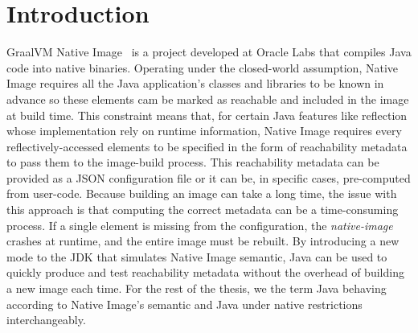 \chapter{Introduction}




GraalVM Native Image~\cite{noauthor_native_nodate} is a project developed at Oracle Labs that compiles Java code into native binaries. Operating under the closed-world assumption, Native Image requires all the Java application's classes and libraries to be known in advance so these elements cam be marked as reachable and included in the image at build time.
This constraint means that, for certain Java features like reflection whose implementation rely on runtime information, Native Image requires every reflectively-accessed elements to be specified in the form of reachability metadata to pass them to the image-build process. This reachability metadata can be provided as a JSON configuration file or it can be, in specific cases, pre-computed from user-code.
Because building an image can take a long time, the issue with this approach is that computing the correct metadata can be a time-consuming process. If a single element is missing from the configuration, the \textit{native-image} crashes at runtime, and the entire image must be rebuilt.
By introducing a new mode to the JDK that simulates Native Image semantic, Java can be used to quickly produce and test reachability metadata without the overhead of building a new image each time. For the rest of the thesis, we the term Java behaving according to Native Image's semantic and Java under native restrictions interchangeably.

